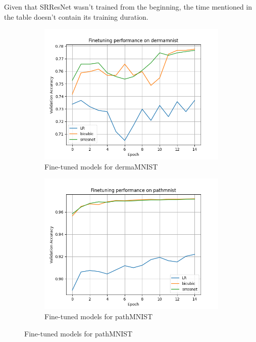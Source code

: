 \documentclass[10pt,twocolumn,letterpaper]{article}
\begin{document}
Given that SRResNet wasn't trained from the beginning, the time mentioned in the table doesn't contain its training duration.




\begin{figure}
    \centering
    \begin{subfigure}{0.3\textwidth}
        \includegraphics[width=\linewidth]{Code/plots/finetune_dermamnist.png}
        \caption{Fine-tuned models for dermaMNIST}
        \label{fig:fine tune derma}
    \end{subfigure}
    
    \begin{subfigure}{0.3\textwidth}
        \includegraphics[width=\linewidth]{Code/plots/finetune_pathmnist.png}
        \caption{Fine-tuned models for pathMNIST}
        \label{fig:fine tune path}
    \end{subfigure}


\end{figure}
\end{document}
